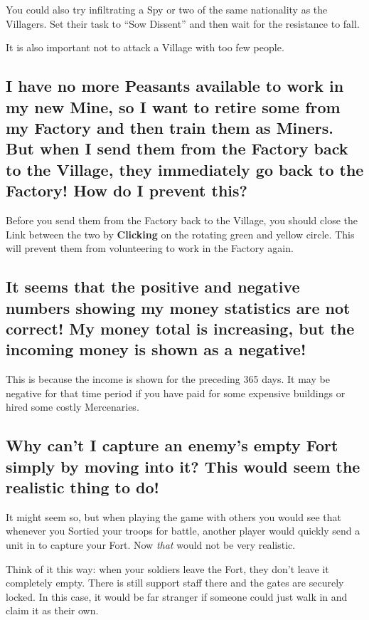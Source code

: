 
You could also try infiltrating a Spy or two of the same nationality as the Villagers. Set their task to “Sow Dissent” and then wait for the resistance to fall.

It is also important not to attack a Village with too few people.

\subsection{I have no more Peasants available to work in my new Mine, so I want to retire some from my Factory and then train them as Miners. But when I send them from the Factory back to the Village, they immediately go back to the Factory! How do I prevent this?}

Before you send them from the Factory back to the Village, you should close the Link between the two by \textbf{Clicking} on the rotating green and yellow circle. This will prevent them from volunteering to work in the Factory again.

\subsection{It seems that the positive and negative numbers showing my money statistics are not correct! My money total is increasing, but the incoming money is shown as a negative!}

This is because the income is shown for the preceding 365 days. It may be negative for that time period if you have paid for some expensive buildings or hired some costly Mercenaries.

\subsection{Why can’t I capture an enemy’s empty Fort simply by moving into it? This would seem the realistic thing to do!}

It might seem so, but when playing the game with others you would see that whenever you Sortied your troops for battle, another player would quickly send a unit in to capture your Fort. Now \textit{that} would not be very realistic.

Think of it this way: when your soldiers leave the Fort, they don’t leave it completely empty. There is still support staff there and the gates are securely locked. In this case, it would be far stranger if someone could just walk in and claim it as their own.

